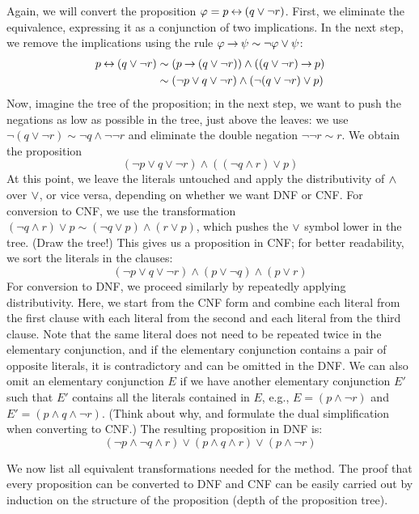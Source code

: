 \begin{example}
    Again, we will convert the proposition $\varphi = p \mathbin{\leftrightarrow} (q \lor \neg r)$. First, we eliminate the equivalence, expressing it as a conjunction of two implications. In the next step, we remove the implications using the rule $\varphi \mathbin{\rightarrow} \psi \sim \neg \varphi \lor \psi$:
    \begin{align*}
        p \mathbin{\leftrightarrow} (q \lor \neg r) &\sim (p \mathbin{\rightarrow} (q \lor \neg r)) \land ((q \lor \neg r) \mathbin{\rightarrow} p)\\
        &\sim (\neg p \lor q \lor \neg r) \land (\neg (q \lor \neg r) \lor p)
    \end{align*}
    Now, imagine the tree of the proposition; in the next step, we want to push the negations as low as possible in the tree, just above the leaves: we use $\neg (q \lor \neg r) \sim \neg q \land \neg \neg r$ and eliminate the double negation $\neg \neg r \sim r$. We obtain the proposition
    $$
    (\neg p \lor q \lor \neg r) \land ( (\neg q \land r) \lor p)
    $$
    At this point, we leave the literals untouched and apply the distributivity of ${\land}$ over ${\lor}$, or vice versa, depending on whether we want DNF or CNF. For conversion to CNF, we use the transformation $(\neg q \land r) \lor p \sim (\neg q \lor p) \land (r \lor p)$, which pushes the ${\lor}$ symbol lower in the tree. (Draw the tree!) This gives us a proposition in CNF; for better readability, we sort the literals in the clauses:
    $$
    (\neg p \lor q \lor \neg r) \land (p \lor \neg q) \land (p \lor r)
    $$
    For conversion to DNF, we proceed similarly by repeatedly applying distributivity. Here, we start from the CNF form and combine each literal from the first clause with each literal from the second and each literal from the third clause. Note that the same literal does not need to be repeated twice in the elementary conjunction, and if the elementary conjunction contains a pair of opposite literals, it is contradictory and can be omitted in the DNF. We can also omit an elementary conjunction $E$ if we have another elementary conjunction $E'$ such that $E'$ contains all the literals contained in $E$, e.g., $E = (p \land \neg r)$ and $E' = (p \land q \land \neg r)$. (Think about why, and formulate the dual simplification when converting to CNF.) The resulting proposition in DNF is:
    $$
    (\neg p \land \neg q \land r) \lor (p \land q \land r) \lor (p \land \neg r)
    $$
\end{example}

We now list all equivalent transformations needed for the method. The proof that every proposition can be converted to DNF and CNF can be easily carried out by induction on the structure of the proposition (depth of the proposition tree).

